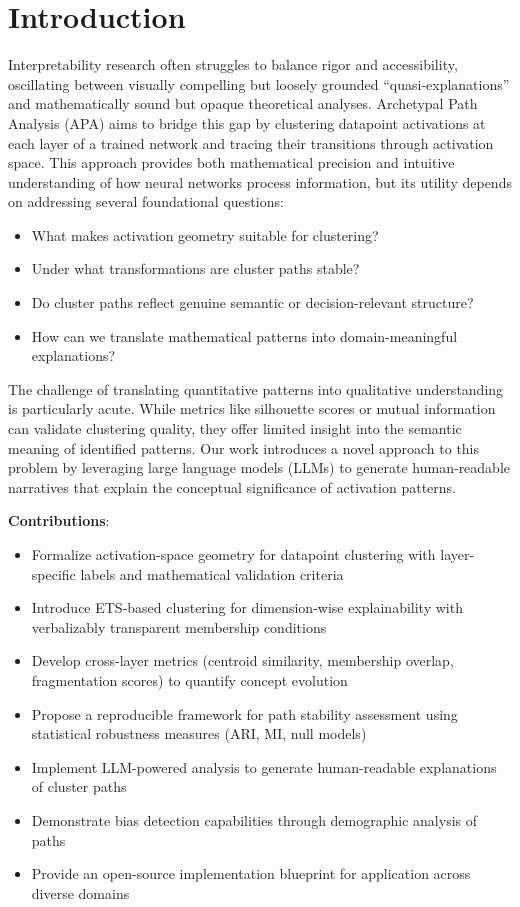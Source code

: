 \section{Introduction}

Interpretability research often struggles to balance rigor and accessibility, oscillating between visually compelling but loosely grounded ``quasi-explanations'' and mathematically sound but opaque theoretical analyses. Archetypal Path Analysis (APA) aims to bridge this gap by clustering datapoint activations at each layer of a trained network and tracing their transitions through activation space. This approach provides both mathematical precision and intuitive understanding of how neural networks process information, but its utility depends on addressing several foundational questions:

\begin{itemize}
    \item What makes activation geometry suitable for clustering?
    \item Under what transformations are cluster paths stable?
    \item Do cluster paths reflect genuine semantic or decision-relevant structure?
    \item How can we translate mathematical patterns into domain-meaningful explanations?
\end{itemize}

The challenge of translating quantitative patterns into qualitative understanding is particularly acute. While metrics like silhouette scores or mutual information can validate clustering quality, they offer limited insight into the semantic meaning of identified patterns. Our work introduces a novel approach to this problem by leveraging large language models (LLMs) to generate human-readable narratives that explain the conceptual significance of activation patterns.

\textbf{Contributions}:
\begin{itemize}
    \item Formalize activation-space geometry for datapoint clustering with layer-specific labels and mathematical validation criteria
    \item Introduce ETS-based clustering for dimension-wise explainability with verbalizably transparent membership conditions
    \item Develop cross-layer metrics (centroid similarity, membership overlap, fragmentation scores) to quantify concept evolution
    \item Propose a reproducible framework for path stability assessment using statistical robustness measures (ARI, MI, null models)
    \item Implement LLM-powered analysis to generate human-readable explanations of cluster paths
    \item Demonstrate bias detection capabilities through demographic analysis of paths
    \item Provide an open-source implementation blueprint for application across diverse domains
\end{itemize}